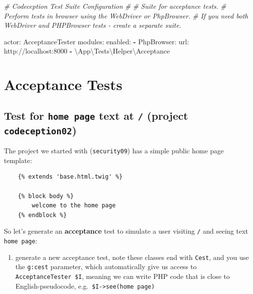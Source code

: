\documentclass[a4paperpaper,openright]{book}
\newenvironment{Shaded}{}{}
\newcommand{\AttributeTok}[1]{\textcolor[rgb]{0.49,0.56,0.16}{#1}}
\newcommand{\CommentTok}[1]{\textcolor[rgb]{0.38,0.63,0.69}{\textit{#1}}}
\newcommand{\FunctionTok}[1]{\textcolor[rgb]{0.02,0.16,0.49}{#1}}
\newcommand{\KeywordTok}[1]{\textcolor[rgb]{0.00,0.44,0.13}{\textbf{#1}}}
\newcommand{\NormalTok}[1]{#1}
\providecommand{\tightlist}{%
  \setlength{\itemsep}{0pt}\setlength{\parskip}{0pt}}
\begin{document}
\begin{itemize}
\begin{Shaded}
\begin{Highlighting}[]
\CommentTok{# Codeception Test Suite Configuration}
\CommentTok{#}
\CommentTok{# Suite for acceptance tests.}
\CommentTok{# Perform tests in browser using the WebDriver or PhpBrowser.}
\CommentTok{# If you need both WebDriver and PHPBrowser tests - create a separate suite.}

\FunctionTok{actor:}\AttributeTok{ AcceptanceTester}
\FunctionTok{modules:}
    \FunctionTok{enabled:}
        \KeywordTok{-} \FunctionTok{PhpBrowser:}
            \FunctionTok{url:}\AttributeTok{ http://localhost:8000}
        \KeywordTok{-}\NormalTok{ \textbackslash{}App\textbackslash{}Tests\textbackslash{}Helper\textbackslash{}Acceptance}
\end{Highlighting}
\end{Shaded}
\end{itemize}

\hypertarget{acceptance-tests}{%
\chapter{Acceptance Tests}\label{acceptance-tests}}

\hypertarget{test-for-home-page-text-at-project-codeception02}{%
\section{\texorpdfstring{Test for \texttt{home\ page} text at \texttt{/}
(project
\texttt{codeception02})}{Test for home page text at / (project codeception02)}}\label{test-for-home-page-text-at-project-codeception02}}

The project we started with (\texttt{security09}) has a simple public
home page template:

\begin{verbatim}
    {% extends 'base.html.twig' %}
    
    {% block body %}
        welcome to the home page
    {% endblock %}
\end{verbatim}

So let's generate an \textbf{acceptance} test to simulate a user
visiting \texttt{/} and seeing text \texttt{home\ page}:

\begin{enumerate}
\def\labelenumi{\arabic{enumi}.}
\tightlist
\item
  generate a new acceptance test, note these classes end with
  \texttt{Cest}, and you use the \texttt{g:cest} parameter, which
  automatically give us access to \texttt{AcceptanceTester\ \$I},
  meaning we can write PHP code that is close to English-pseudocode,
  e.g.~\texttt{\$I-\textgreater{}see(\textquotesingle{}home\ page\textquotesingle{})}
\end{enumerate}
\end{document}
